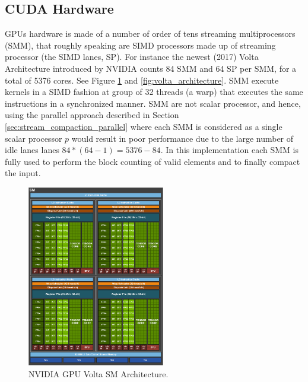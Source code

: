 \subsection{CUDA Hardware}
GPUs hardware is made of a number of order of tens streaming multiprocessors (SMM), that roughly speaking are SIMD processors made up of streaming processor (the SIMD lanes, SP). For instance the newest (2017) Volta Architecture introduced by NVIDIA counts 84 SMM and 64 SP per SMM, for a total of 5376 cores. See Figure \ref{fig:volta_sm} and \ref{fig:volta_architecture}.
SMM execute kernels in a SIMD fashion at group of 32 threads (a warp) that executes the same instructions in a synchronized manner. SMM are not scalar processor, and hence, using the parallel approach described in Section \ref{sec:stream_compaction_parallel} where each SMM is considered as a single scalar processor \(p\) would result in poor performance due to the large number of idle lanes lanes \( 84*(64-1)=5376-84\).
In this implementation each SMM is fully used to perform the block counting of valid elements and to finally compact the input.
\begin{figure}
	\begin{center}
		\includegraphics[width=6cm]{./images/stream_compaction/volta_sm}
		\caption{NVIDIA GPU Volta SM Architecture.}
		\label{fig:volta_sm}
	\end{center}
\end{figure}

